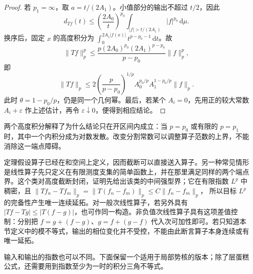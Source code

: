 \begin{proof}
若 \(p_1=\infty\)，取 \(a=t/(2A_1)\)。小值部分的输出不超过 \(t/2\)，因此
\[
 d_{Tf}(t)\leq\left(\frac{2A_0}{t}\right)^{p_0}
       \int_{|f|>t/(2A_1)}|f|^{p_0}\,\mathrm d\mu.
\]
换序后，固定 \(x\) 的高度积分为
\(\int_0^{2A_1|f(x)|}t^{p-p_0-1}\,\mathrm dt\)。故
\[
 \|Tf\|_p^p\leq
 \frac{p(2A_0)^{p_0}(2A_1)^{p-p_0}}{p-p_0}\|f\|_p^p,
\]
即
\[
 \|Tf\|_p\leq
 2\left(\frac p{p-p_0}\right)^{1/p}
 A_0^{p_0/p}A_1^{1-p_0/p}\|f\|_p.
\]
此时 \(\theta=1-p_0/p\)，仍是同一个几何幂。最后，若某个 \(A_i=0\)，先用正的较大常数 \(A_i+\varepsilon\) 作上述估计，再令 \(\varepsilon\downarrow0\)，便得到相应结论。
\end{proof}

两个高度积分解释了为什么结论只在开区间内成立：当 \(p=p_0\) 或有限的 \(p=p_1\) 时，其中一个内积分成为对数发散。改变分割常数可以调整算子范数的上界，不能消除这一端点障碍。

\ProseParagraphBreak

定理假设算子已经在和空间上定义，因而截断可以直接送入算子。另一种常见情形是线性算子先只定义在有限测度支集的简单函数上，并在那里满足同样的两个端点界。这个类对高度截断封闭，证明先给出该类的中间强型界；它在有限指数 \(L^p\) 中稠密，且
\(\|Tf_n-Tf_m\|_p=\|T(f_n-f_m)\|_p\leq C\|f_n-f_m\|_p\)，
所以目标 \(L^p\) 的完备性产生唯一连续延拓。对一般次线性算子，若另外具有
\(|Tf-Tg|\leq|T(f-g)|\)，也可作同一构造。非负值次线性算子具有这项差值控制：分别把 \(f=g+(f-g)\)、\(g=f+(g-f)\) 代入次可加性即可。若只知道本节定义中的模不等式，输出的相位变化并不受控，不能由此断言算子本身连续或有唯一延拓。

\ProseParagraphBreak

输入和输出的指数也可以不同。下面保留一个适用于局部势核的版本；除了层蛋糕公式，还需要用到指数至少为一时的积分三角不等式。

